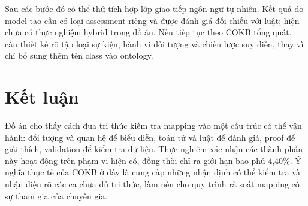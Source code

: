 Sau các bước đó có thể thử tích hợp lớp giao tiếp ngôn ngữ tự nhiên.
Kết quả do model tạo cần có loại assessment riêng và được đánh giá đối
chiếu với luật; hiện chưa có thực nghiệm hybrid trong đồ án.
Nếu tiếp tục theo COKB tổng quát, cần thiết kế rõ tập loại sự kiện,
hành vi đối tượng và chiến lược suy diễn, thay vì chỉ bổ sung thêm tên
class vào ontology.

\section{Kết luận}
Đồ án cho thấy cách đưa tri thức kiểm tra mapping vào một cấu trúc có
thể vận hành: đối tượng và quan hệ để biểu diễn, toán tử và luật để
đánh giá, proof để giải thích, validation để kiểm tra dữ liệu.
Thực nghiệm xác nhận các thành phần này hoạt động trên phạm vi hiện có,
đồng thời chỉ ra giới hạn bao phủ 4,40\%.
Ý nghĩa thực tế của COKB ở đây là cung cấp những nhận định có thể kiểm tra
và nhận diện rõ các ca chưa đủ tri thức, làm nền cho quy trình rà soát
mapping có sự tham gia của chuyên gia.
